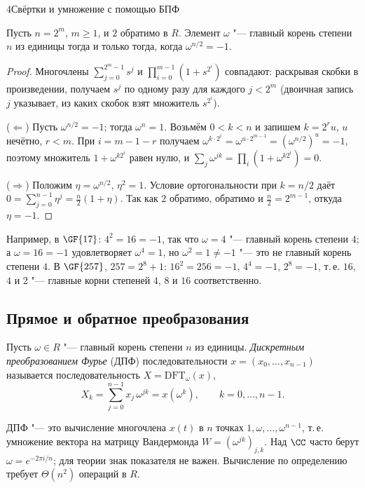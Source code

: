 \begin{lecture}{4}{Свёртки и умножение с помощью БПФ}
\begin{lemma}\label{l4:pow2}
Пусть $n = 2^m$, $m \ge 1$, и $2$ обратимо в $R$. Элемент $\omega$ "--- главный корень степени
$n$ из единицы тогда и только тогда, когда $\omega^{n/2} = -1$.
\end{lemma}

\begin{proof}
Многочлены $\sum_{j=0}^{2^m - 1} s^j$ и $\prod_{i=0}^{m-1} (1 + s^{2^i})$ совпадают: раскрывая
скобки в произведении, получаем $s^j$ по одному разу для каждого $j < 2^m$ (двоичная запись
$j$ указывает, из каких скобок взят множитель $s^{2^i}$).

($\Leftarrow$) Пусть $\omega^{n/2} = -1$; тогда $\omega^n = 1$. Возьмём $0 < k < n$ и запишем
$k = 2^r u$, $u$ нечётно, $r < m$. При $i = m - 1 - r$ получаем
$\omega^{k \cdot 2^i} = \omega^{u \cdot 2^{m-1}} = (\omega^{n/2})^u = -1$, поэтому множитель
$1 + \omega^{k 2^i}$ равен нулю, и $\sum_j \omega^{jk} = \prod_i (1 + \omega^{k 2^i}) = 0$.

($\Rightarrow$) Положим $\eta = \omega^{n/2}$, $\eta^2 = 1$. Условие ортогональности при
$k = n/2$ даёт $0 = \sum_{j=0}^{n-1} \eta^j = \frac n2 (1 + \eta)$. Так как $2$ обратимо,
обратимо и $\frac n2 = 2^{m-1}$, откуда $\eta = -1$.
\end{proof}

Например, в $\GF{17}$: $4^2 = 16 = -1$, так что $\omega = 4$ "--- главный корень степени $4$;
а $\omega = 16 = -1$ удовлетворяет $\omega^4 = 1$, но $\omega^2 = 1 \ne -1$ "--- это не главный
корень степени $4$. В $\GF{257}$, $257 = 2^8 + 1$: $16^2 = 256 = -1$, $4^4 = -1$, $2^8 = -1$,
т.\,е. $16$, $4$ и $2$ "--- главные корни степеней $4$, $8$ и $16$ соответственно.

\subsection{Прямое и обратное преобразования}

\begin{definition}\label{l4:dft}
Пусть $\omega \in R$ "--- главный корень степени $n$ из единицы. \emph{Дискретным
преобразованием Фурье} (ДПФ) последовательности $x = (x_0, \dots, x_{n-1})$ называется
последовательность $X = \mathrm{DFT}_\omega(x)$,
\[
  X_k = \sum_{j=0}^{n-1} x_j\, \omega^{jk} = x(\omega^k), \qquad k = 0, \dots, n - 1.
\]
\end{definition}

ДПФ "--- это вычисление многочлена $x(t)$ в $n$ точках $1, \omega, \dots, \omega^{n-1}$,
т.\,е. умножение вектора на матрицу Вандермонда $W = (\omega^{jk})_{j,k}$. Над $\CC$ часто
берут $\omega = e^{-2\pi i/n}$; для теории знак показателя не важен. Вычисление по
определению требует $\Theta(n^2)$ операций в $R$.


\end{lecture}
